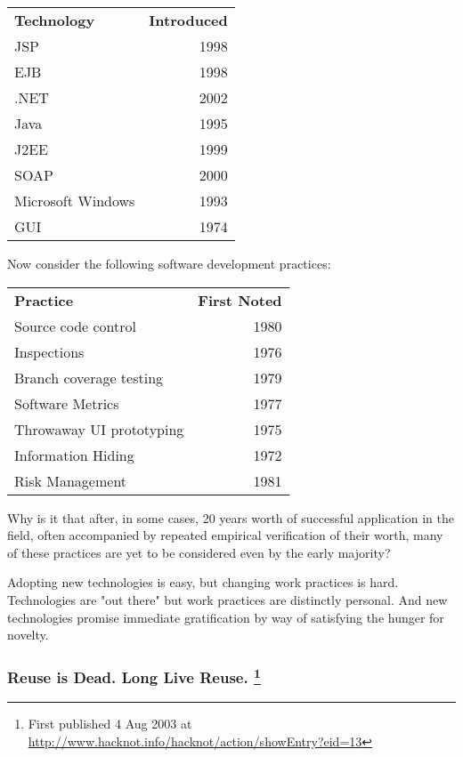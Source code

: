 \documentclass{article}
\begin{document}
\begin{center}
\begin{tabular}{lr}
\textbf{Technology} & \textbf{Introduced}\\
JSP & 1998\\
EJB & 1998\\
.NET & 2002\\
Java & 1995\\
J2EE & 1999\\
SOAP & 2000\\
Microsoft Windows & 1993\\
GUI & 1974\\
\end{tabular}
\end{center}

Now consider the following software development practices:

\begin{center}
\begin{tabular}{lr}
\textbf{Practice} & \textbf{First Noted}\\
Source code control & 1980\\
Inspections & 1976\\
Branch coverage testing & 1979\\
Software Metrics & 1977\\
Throwaway UI prototyping & 1975\\
Information Hiding & 1972\\
Risk Management & 1981\\
\end{tabular}
\end{center}

Why is it that after, in some cases, 20 years worth of successful
application in the field, often accompanied by repeated empirical
verification of their worth, many of these practices are yet to be
considered even by the early majority?

Adopting new technologies is easy, but changing work practices is hard.
Technologies are "out there" but work practices are distinctly personal.
And new technologies promise immediate gratification by way of
satisfying the hunger for novelty.

\subsubsection{Reuse is Dead. Long Live Reuse. \footnote{First published 4 Aug 2003 at
\url{http://www.hacknot.info/hacknot/action/showEntry?eid=13}}}
\label{sec:orgheadline417}
\end{document}

